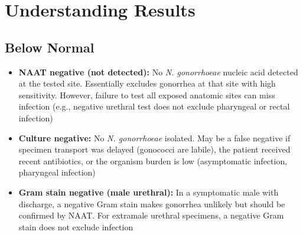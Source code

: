 \section*{Understanding Results}

\subsection*{Below Normal}
\begin{itemize}
  \item \textbf{NAAT negative (not detected):} No \textit{N. gonorrhoeae} nucleic acid detected at the tested site. Essentially excludes gonorrhea at that site with high sensitivity. However, failure to test all exposed anatomic sites can miss infection (e.g., negative urethral test does not exclude pharyngeal or rectal infection)
  \item \textbf{Culture negative:} No \textit{N. gonorrhoeae} isolated. May be a false negative if specimen transport was delayed (gonococci are labile), the patient received recent antibiotics, or the organism burden is low (asymptomatic infection, pharyngeal infection)
  \item \textbf{Gram stain negative (male urethral):} In a symptomatic male with discharge, a negative Gram stain makes gonorrhea unlikely but should be confirmed by NAAT. For extramale urethral specimens, a negative Gram stain does not exclude infection
\end{itemize}

